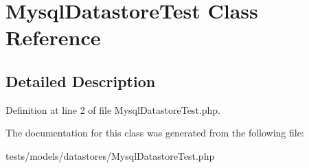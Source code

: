 \hypertarget{class_mysql_datastore_test}{
\section{MysqlDatastoreTest Class Reference}
\label{class_mysql_datastore_test}
}


\subsection{Detailed Description}


Definition at line 2 of file MysqlDatastoreTest.php.



The documentation for this class was generated from the following file:\begin{DoxyCompactItemize}
\item 
tests/models/datastores/MysqlDatastoreTest.php\end{DoxyCompactItemize}
